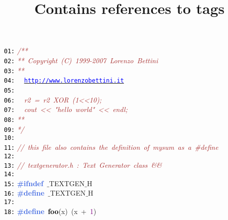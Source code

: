 \documentclass{article}
\title{Contains references to tags}
\date{}
\begin{document}
\maketitle
\noindent
\mbox{}\texttt{\textcolor{Black}{01:}} \textit{\textcolor{Brown}{/**}} \\
\mbox{}\texttt{\textcolor{Black}{02:}} \textit{\textcolor{Brown}{**\ Copyright\ (C)\ 1999-2007\ Lorenzo\ Bettini}} \\
\mbox{}\texttt{\textcolor{Black}{03:}} \textit{\textcolor{Brown}{**\ \ }} \\
\mbox{}\texttt{\textcolor{Black}{04:}} \textit{\textcolor{Brown}{\ \ }}\underline{\texttt{\textcolor{Blue}{http://www.lorenzobettini.it}}} \\
\mbox{}\texttt{\textcolor{Black}{05:}} \textit{\textcolor{Brown}{\ \ }} \\
\mbox{}\texttt{\textcolor{Black}{06:}} \textit{\textcolor{Brown}{\ \ r2\ =\ r2\ XOR\ (1\textless{}\textless{}10);}} \\
\mbox{}\texttt{\textcolor{Black}{07:}} \textit{\textcolor{Brown}{\ \ cout\ \textless{}\textless{}\ "{}hello\ world"{}\ \textless{}\textless{}\ endl;}} \\
\mbox{}\texttt{\textcolor{Black}{08:}} \textit{\textcolor{Brown}{**\ \ }} \\
\mbox{}\texttt{\textcolor{Black}{09:}} \textit{\textcolor{Brown}{*/}} \\
\mbox{}\texttt{\textcolor{Black}{10:}}  \\
\mbox{}\texttt{\textcolor{Black}{11:}} \textit{\textcolor{Brown}{//\ this\ file\ also\ contains\ the\ definition\ of\ mysum\ as\ a\ \#define}} \\
\mbox{}\texttt{\textcolor{Black}{12:}}  \\
\mbox{}\texttt{\textcolor{Black}{13:}} \textit{\textcolor{Brown}{//\ textgenerator.h\ :\ Text\ Generator\ class\ \&\&}} \\
\mbox{}\texttt{\textcolor{Black}{14:}}  \\
\mbox{}\texttt{\textcolor{Black}{15:}} \textbf{\textcolor{RoyalBlue}{\#ifndef}}\ $\_$TEXTGEN$\_$H \\
\mbox{}\texttt{\textcolor{Black}{16:}} \textbf{\textcolor{RoyalBlue}{\#define}}\ \label{test.h:16}$\_$TEXTGEN$\_$H \\
\mbox{}\texttt{\textcolor{Black}{17:}}  \\
\mbox{}\texttt{\textcolor{Black}{18:}} \textbf{\textcolor{RoyalBlue}{\#define}}\ \textbf{\textcolor{Black}{\label{test.h:18}foo}}\textcolor{BrickRed}{(}x\textcolor{BrickRed}{)}\ \textcolor{BrickRed}{(}x\ \textcolor{BrickRed}{+}\ \textcolor{Purple}{1}\textcolor{BrickRed}{)} \\
\end{document}
